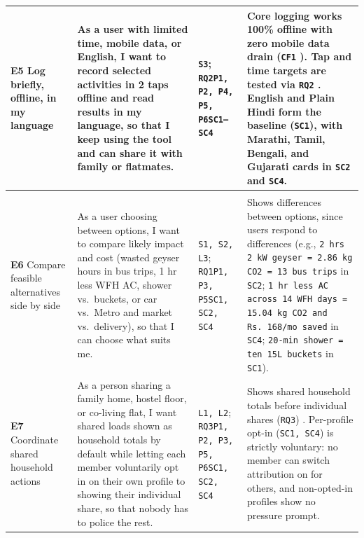 \documentclass[12pt, a4paper]{article}
\begin{document}
{\begin{longtable}{|>{\raggedright\arraybackslash}p{2.7cm}|>{\raggedright\arraybackslash}p{5.2cm}|>{\raggedright\arraybackslash}p{2.9cm}|>{\raggedright\arraybackslash}p{5.2cm}|}
\hline
\textbf{E5} Log briefly, offline, in my language & As a user with limited time, mobile data, or English, I want to record selected activities in 2 taps offline and read results in my language, so that I keep using the tool and can share it with family or flatmates. & \texttt{S3}; \texttt{RQ2}\newline \texttt{P1, P2, P4, P5, P6}\newline \texttt{SC1--SC4} & Core logging works 100\% offline with zero mobile data drain (\texttt{CF1} \cite{cf1}). Tap and time targets are tested via \texttt{RQ2} \cite{hoffmann2024,cf1,cf7}. English and Plain Hindi form the baseline (\texttt{SC1}), with Marathi, Tamil, Bengali, and Gujarati cards in \texttt{SC2} and \texttt{SC4}. \\
\hline

\rowcolor{bgSand}\multicolumn{4}{|l|}{\textbf{\textcolor{cTerracotta}{SHOULD HAVE: Comparison, Shared Household Action, Repeat Review, and Audit Export}}} \\
\hline
\textbf{E6} Compare feasible alternatives side by side & As a user choosing between options, I want to compare likely impact and cost (wasted geyser hours in bus trips, 1 hr less WFH AC, shower vs.\ buckets, or car vs.\ Metro and market vs.\ delivery), so that I can choose what suits me. & \texttt{S1, S2, L3}; \texttt{RQ1}\newline \texttt{P1, P3, P5}\newline \texttt{SC1, SC2, SC4} & Shows differences between options, since users respond to differences \cite{mohanty2023} (e.g., \texttt{2 hrs 2 kW geyser = 2.86 kg CO2 = 13 bus trips} in \texttt{SC2}; \texttt{1 hr less AC across 14 WFH days = 15.04 kg CO2 and Rs.\ 168/mo saved} in \texttt{SC4}; \texttt{20-min shower = ten 15L buckets} in \texttt{SC1}). \\
\hline
\textbf{E7} Coordinate shared household actions & As a person sharing a family home, hostel floor, or co-living flat, I want shared loads shown as household totals by default while letting each member voluntarily opt in on their own profile to showing their individual share, so that nobody has to police the rest. & \texttt{L1, L2}; \texttt{RQ3}\newline \texttt{P1, P2, P3, P5, P6}\newline \texttt{SC1, SC2, SC4} & Shows shared household totals before individual shares (\texttt{RQ3}) \cite{froehlich2012,tiefenbeck2019}. Per-profile opt-in (\texttt{SC1, SC4}) is strictly voluntary: no member can switch attribution on for others, and non-opted-in profiles show no pressure prompt. \\

\end{longtable}}
\end{document}
